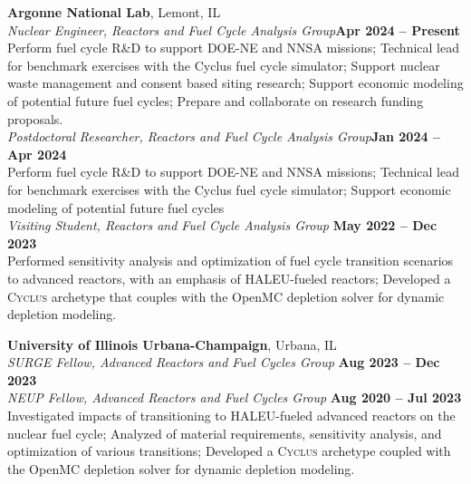 \documentclass[margin,line]{resume}
\newcommand{\Cyclus}{\textsc{Cyclus}\xspace}%
\begin{document}
\begin{resume}
    \textbf{Argonne National Lab}, Lemont, IL \vspace{1mm}\\
                \textsl{Nuclear Engineer, Reactors and Fuel Cycle Analysis Group}\hfill \textbf{Apr 2024 -- Present}\\
                Perform fuel cycle R\&D to support DOE-NE and NNSA missions; Technical lead for 
                benchmark exercises with 
                the Cyclus fuel cycle simulator; Support nuclear waste management and consent based 
                siting research; Support economic modeling of potential future 
                fuel cycles; Prepare and collaborate on research funding proposals. \vspace{2mm}\\                
                \textsl{Postdoctoral Researcher, Reactors and Fuel Cycle Analysis Group}\hfill \textbf{Jan 2024 -- Apr 2024}\\
                Perform fuel cycle R\&D to support DOE-NE and NNSA missions; Technical lead for 
                benchmark exercises with 
                the Cyclus fuel cycle simulator; Support economic modeling of potential future 
                fuel cycles\vspace{2mm}\\                
                \textsl{Visiting Student, Reactors and Fuel Cycle Analysis Group} \hfill \textbf{May 2022 -- Dec 2023}\\
                Performed sensitivity analysis and optimization of fuel cycle 
                transition scenarios to advanced reactors, with an emphasis of HALEU-fueled reactors; 
                Developed a \Cyclus archetype that couples with the OpenMC depletion 
                solver for dynamic depletion modeling. 

    \textbf{University of Illinois Urbana-Champaign}, Urbana, IL  \vspace{1mm}\\
                \textsl{SURGE Fellow, Advanced Reactors and Fuel Cycles Group} \hfill \textbf{Aug 2023 -- Dec 2023}\\
                \textsl{NEUP Fellow, Advanced Reactors and Fuel Cycles Group} \hfill \textbf{Aug 2020 -- Jul 2023}\\
                Investigated impacts of transitioning to HALEU-fueled advanced 
                reactors on the nuclear fuel cycle; Analyzed of material 
                requirements, sensitivity analysis, and optimization 
                of various transitions; Developed a \Cyclus archetype coupled
                with the OpenMC depletion solver for dynamic depletion modeling. 


\end{resume}
\end{document}
